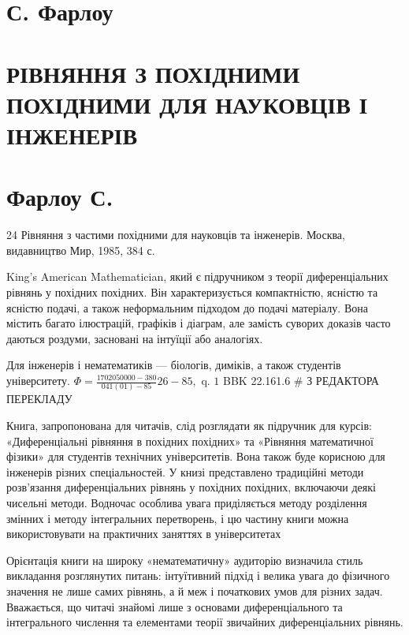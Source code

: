 \section{С. Фарлоу}\label{ux441.-ux444ux430ux440ux43bux43eux443}

\section{РІВНЯННЯ З ПОХІДНИМИ ПОХІДНИМИ ДЛЯ НАУКОВЦІВ І ІНЖЕНЕРІВ}\label{ux440ux456ux432ux43dux44fux43dux43dux44f-ux437-ux43fux43eux445ux456ux434ux43dux438ux43cux438-ux43fux43eux445ux456ux434ux43dux438ux43cux438-ux434ux43bux44f-ux43dux430ux443ux43aux43eux432ux446ux456ux432-ux456-ux456ux43dux436ux435ux43dux435ux440ux456ux432}

\section{Фарлоу С.}\label{ux444ux430ux440ux43bux43eux443-ux441.}

24 Рівняння з частими похідними для науковців та інженерів. Москва, видавництво Мир, 1985, 384 с.

King's American Mathematician, який є підручником з теорії диференціальних рівнянь у похідних похідних. Він характеризується компактністю, ясністю та ясністю подачі, а також неформальним підходом до подачі матеріалу. Вона містить багато ілюстрацій, графіків і діаграм, але замість суворих доказів часто даються роздуми, засновані на інтуїції або аналогіях.

Для інженерів і нематематиків --- біологів, диміків, а також студентів університету. \(\Phi = \frac{1702050000-380}{041(01)-85} 26-85, \text{ q. 1}\) BBK 22.161.6 \# З РЕДАКТОРА ПЕРЕКЛАДУ

Книга, запропонована для читачів, слід розглядати як підручник для курсів: «Диференціальні рівняння в похідних похідних» та «Рівняння математичної фізики» для студентів технічних університетів. Вона також буде корисною для інженерів різних спеціальностей. У книзі представлено традиційні методи розв'язання диференціальних рівнянь у похідних похідних, включаючи деякі чисельні методи. Водночас особлива увага приділяється методу розділення змінних і методу інтегральних перетворень, і цю частину книги можна використовувати на практичних заняттях в університетах

Орієнтація книги на широку «нематематичну» аудиторію визначила стиль викладання розглянутих питань: інтуїтивний підхід і велика увага до фізичного значення не лише самих рівнянь, а й меж і початкових умов для різних задач. Вважається, що читачі знайомі лише з основами диференціального та інтегрального числення та елементами теорії звичайних диференціальних рівнянь.

